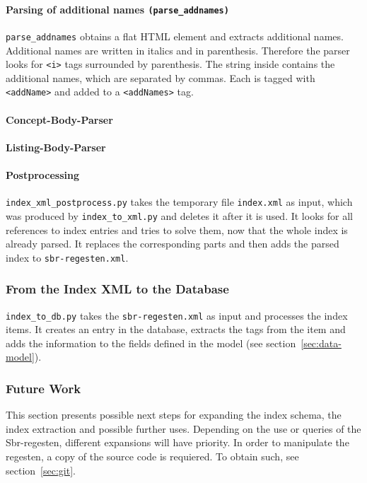 \paragraph{Parsing of additional names \texttt{(parse\_addnames)}}
\label{sec:addNames}
\texttt{parse\_addnames} obtains a flat HTML element and extracts additional names. Additional names are written in italics and in parenthesis. Therefore the parser looks for \texttt{<i>} tags surrounded by parenthesis. The string inside contains the additional names, which are separated by commas. Each is tagged with \texttt{<addName>} and added to a \texttt{<addNames>} tag.

\paragraph{Concept-Body-Parser}

\paragraph{Listing-Body-Parser}


\paragraph{Postprocessing}
\label{sec:postproc}
\texttt{index\_xml\_postprocess.py} takes the temporary file \texttt{index.xml} as input, which was produced by \texttt{index\_to\_xml.py} and deletes it after it is used. It looks for all references to index entries and tries to solve them, now that the whole index is already parsed. It replaces the corresponding parts and then adds the parsed index to \texttt{sbr-regesten.xml}.

\subsubsection{From the Index XML to the Database}
\texttt{index\_to\_db.py} takes the \texttt{sbr-regesten.xml} as input and processes the index items. It creates an entry in the database, extracts the tags from the item and adds the information to the fields defined in the model (see section~\ref{sec:data-model}).





\subsubsection{Future Work}

This section presents possible next steps for expanding the index schema, the index extraction and possible further uses. Depending on the use or queries of the Sbr-regesten, different expansions will have priority. In order to manipulate the regesten, a copy of the source code is requiered. To obtain such, see section~\ref{sec:git}.
